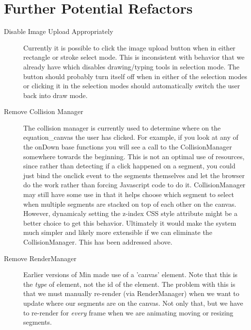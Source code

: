 \documentclass[letterpaper]{article}
\begin{document}
\section*{Further Potential Refactors}

\begin{description}
    \item[Disable Image Upload Appropriately] Currently it is possible to click the image
        upload button when in either rectangle or stroke select mode. This is
        inconsistent with behavior that we already have which disables
        drawing/typing tools in selection mode. The button should probably turn
        itself off when in either of the selection modes or clicking it in the
        selection modes should automatically switch the user back into draw
        mode.
    \item[Remove Collision Manager] The collision manager is currently used to
        determine where on the equation\_canvas the user has clicked. For
        example, if you look at any of the onDown base functions you will see a
        call to the CollisionManager somewhere towards the beginning. This is
        not an optimal use of resources, since rather than detecting if a
        click happened on a segment, you could just bind the onclick event to
        the segments themselves and let the browser do the work rather than
        forcing Javascript code to do it. CollisionManager may still have some
        use in that it helps choose which segment to select when multiple
        segments are stacked on top of each other on the canvas. However,
        dynamicaly setting the z-index CSS style attribute might be a better
        choice to get this behavior. Ultimately it would make the system much
        simpler and likely more extensible if we can eliminate the
        CollisionManager. This has been addressed above. 
    \item[Remove RenderManager] Earlier versions of Min made use of a 'canvas'
        element. Note that this is the \emph{type} of element, not the id of the
        element. The problem with this is that we must manually re-render (via
        RenderManager) when we want to update where our segments are on the
        canvas. Not only that, but we have to re-render for \emph{every} frame
        when we are animating moving or resizing segments. 
        

\end{description}
\end{document}
